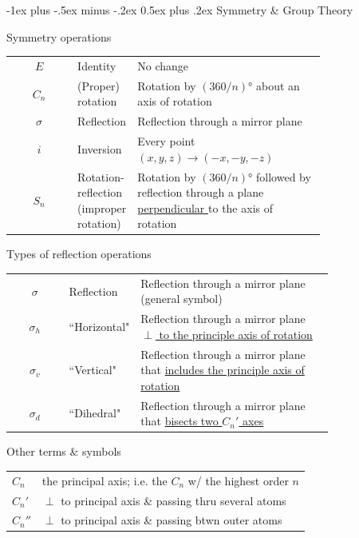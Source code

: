 \documentclass[10pt,landscape]{article}
\makeatletter
\renewcommand{\section}{\@startsection{section}{1}{0mm}%
                                {-1ex plus -.5ex minus -.2ex}%
                                {0.5ex plus .2ex}%
                                {\normalfont\large\bfseries}}
\newcommand{\extraline}{\vspace{1em}}
\newcommand{\tableindent}{\hspace{1.5em}}
\makeatother
\begin{document}
\begin{multicols}{3}
\hrulefill

\section{Symmetry \& Group Theory}


Symmetry operations
%
\renewcommand{\arraystretch}{1.4}
\begin{tabular}{@{\tableindent}cp{0.18\linewidth}<{\raggedright}p{0.6\linewidth}<{\raggedright}@{}}
	$E$ & Identity & No change \\
	$C_n$ & (Proper) rotation  & Rotation by $(360/n)$° about an axis of rotation \\
	$\sigma$ & Reflection  & Reflection through a mirror plane \\
	$i$ & Inversion  & Every point $(x, y, z) \rightarrow (-x, -y, -z)$ \\ %
	$S_n$ & Rotation-reflection (improper rotation)  & Rotation by $(360/n)$° followed by reflection through a plane \underline{perpendicular }to the axis of rotation
\end{tabular}
\renewcommand{\arraystretch}{1}

Types of reflection operations
%
\renewcommand{\arraystretch}{1.4}
\begin{tabular}{@{\tableindent}cp{0.2\linewidth}<{\raggedright}p{0.6\linewidth}<{\raggedright}@{}}
	$\sigma$ & Reflection & Reflection through a mirror plane (general symbol) \\
	$\sigma_h$ & ``Horizontal"  & Reflection through a mirror plane \underline{$\perp$ to the principle axis of rotation} \\
	$\sigma_v$ & ``Vertical" & Reflection through a mirror plane that \underline{includes the principle axis of} \underline{rotation} \\
	$\sigma_d$ & ``Dihedral" & Reflection through a mirror plane that \underline{bisects two $C_n'$ axes} \\
\end{tabular}
\renewcommand{\arraystretch}{1}

Other terms \& symbols
\renewcommand{\arraystretch}{1.4}
\begin{tabular}{@{\tableindent}lp{0,8\linewidth}@{}}
	$C_n$ & the principal axis; i.e. the $C_n$ w/ the highest order $n$ \\
	$C_n'$ & $\perp$ to principal axis \& passing thru several atoms \\
	$C_n''$ & $\perp$ to principal axis \& passing btwn outer atoms \\
\end{tabular}
\renewcommand{\arraystretch}{1}


\end{multicols}
\end{document}
